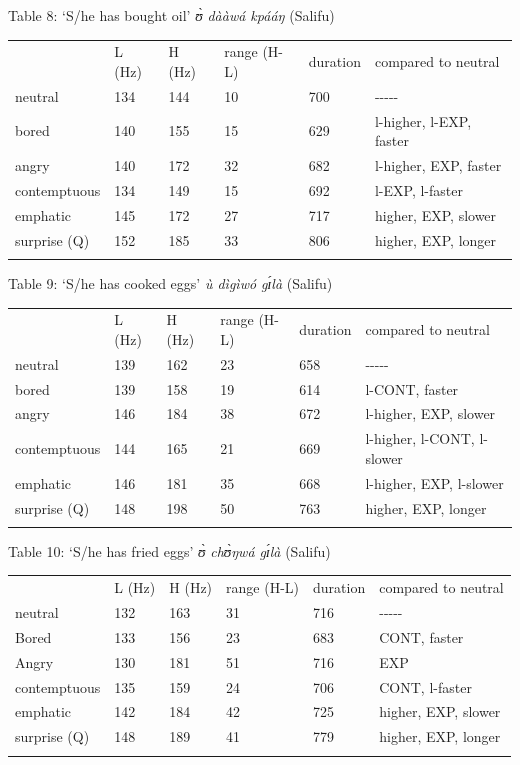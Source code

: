 \documentclass[output=paper]{langsci/langscibook}
\begin{document}
Table 8: ‘S/he has bought oil'  \emph{ʊ̀ dààwá kpááŋ}  (Salifu)

\begin{tabular}{llllll} & L (Hz) & H (Hz) & range (H-L) & duration & compared to neutral\\
\lsptoprule
neutral & 134 & 144 & 10 & 700 & {}-{}-{}-{}-{}-\\
bored & 140 & 155 & 15 & 629 & l-higher, l-EXP, faster\\
angry & 140 & 172 & 32 & 682 & l-higher, EXP, faster\\
contemptuous & 134 & 149 & 15 & 692 & l-EXP, l-faster\\
emphatic & 145 & 172 & 27 & 717 & higher, EXP, slower\\
surprise (Q) & 152 & 185 & 33 & 806 & higher, EXP, longer\\
\lspbottomrule
\end{tabular}


Table 9: ‘S/he has cooked eggs'  \emph{ù dìgìwó gɪ́là}  (Salifu)

\begin{tabular}{llllll} & L (Hz) & H (Hz) & range (H-L) & duration & compared to neutral\\
\lsptoprule
neutral & 139 & 162 & 23 & 658 & {}-{}-{}-{}-{}-\\
bored & 139 & 158 & 19 & 614 & l-CONT, faster\\
angry & 146 & 184 & 38 & 672 & l-higher, EXP, slower\\
contemptuous & 144 & 165 & 21 & 669 & l-higher, l-CONT, l-slower\\
emphatic & 146 & 181 & 35 & 668 & l-higher, EXP, l-slower\\
surprise (Q) & 148 & 198 & 50 & 763 & higher, EXP, longer\\
\lspbottomrule
\end{tabular}


Table 10: ‘S/he has fried eggs'   \emph{ʊ̀ chʊ̀ŋwá gɪ́là}  (Salifu)

\begin{tabular}{llllll} & L (Hz) & H (Hz) & range (H-L) & duration & compared to neutral\\
\lsptoprule
neutral & 132 & 163 & 31 & 716 & {}-{}-{}-{}-{}-\\
Bored & 133 & 156 & 23 & 683 & CONT, faster\\
Angry & 130 & 181 & 51 & 716 & EXP\\
contemptuous & 135 & 159 & 24 & 706 & CONT, l-faster\\
emphatic & 142 & 184 & 42 & 725 & higher, EXP, slower\\
surprise (Q) & 148 & 189 & 41 & 779 & higher, EXP, longer\\
\lspbottomrule
\end{tabular}
\end{document}
